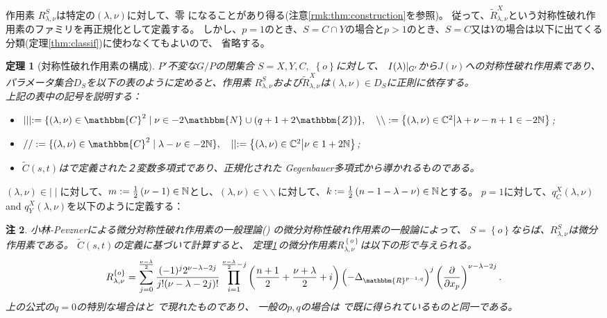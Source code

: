\documentclass[12pt]{article} %
\newcommand{\assign}{:=}
\newtheorem{theorem}{定理}
\newtheorem{remark}[theorem]{注}
\theoremstyle{definition}
\theoremstyle{exampstyle} \newtheorem{examp}[theorem]{Theorem}
\newcommand{\IlambdaGprime}{I(\lambda)\kern-0.3em\mid_{G'}}
\newcommand{\bb}{\backslash\backslash}
\begin{document}
作用素
$R_{\lambda,\nu}^S$は特定の$(\lambda,\nu)$に対して、零
になることがあり得る(注意\ref{rmk:thm:construction}を参照)。
従って、$\tilde{R}^X_{\lambda,\nu}$という対称性破れ作用素のファミリを再正規化として定義する。
しかし、$p=1$のとき、$S=C\cap Y$の場合と$p>1$のとき、$S=C$又は$Y$の場合は以下に出てくる分類(定理\ref{thm:classif})に使わなくてもよいので、
省略する。
\newpage
\begin{theorem}[対称性破れ作用素の構成]\label{thm:construction}
	$P'$不変な$G/P$の閉集合
	$S=X,Y,C,$ $\left\{ o \right\}$に対して、
	$\IlambdaGprime$から$J(\nu)$への対称性破れ作用素であり、
	パラメータ集合$D_S$を以下の表のように定めると、作用素
	$R_{\lambda,\nu}^S$および$\tilde{R}_{\lambda,\nu}^X$は$(\lambda,\nu)\in D_S$に正則に依存する。
	\\
\vspace{\baselineskip}
上記の表中の記号を説明する：
\begin{itemize}
	\item $\mid \mid \mid \assign \{ (\lambda, \nu) \in \mathbbm{C}^2 \mid \nu \in
	- 2\mathbbm{N} \cup (q + 1 + 2\mathbbm{Z}) \},\quad \backslash\backslash:=\mysetn{(\lambda,\nu)\in\C^2}{\lambda+\nu-n+1\in-2\N}$;
\item $/ / \assign
\{ (\lambda, \nu) \in \mathbbm{C}^2 \mid \lambda - \nu \in
-2\N \},\quad \mid\mid:=\mysetn{(\lambda,\nu)\in\C^2}{\nu\in1+2\N}$;
\item $\tilde{C}(s,t)$は\cite[(16.3)]{kobayashi2015symmetry}で定義された２変数多項式であり、正規化された
	Gegenbauer多項式から導かれるものである。
\end{itemize}
\end{theorem}
$(\lambda,\nu)\in\mid\mid$に対して、$m:=\frac{1}{2}\left( \nu-1 \right)\in\mathbb{N}$とし、$(\lambda,\nu)\in\bb$に対して、$k:=\frac{1}{2}\left( n-1-\lambda-\nu \right)\in\mathbb{N}$とする。
$p=1$に対して、$q_C^X(\lambda,\nu)$ and $q_Y^X(\lambda,\nu)$を以下のように定義する：
\begin{remark}
	小林-Pevznerによる微分対称性破れ作用素の一般理論(\cite[Chap.\ 2]{kobayashi2016differential1})
	の微分対称性破れ作用素の一般論によって、
	$S=\left\{ o \right\}$ならば、$R_{\lambda,\nu}^S$は微分作用素である。
	$\tilde{C}(s,t)$の定義に基づいて計算すると、
	定理\ref{thm:construction}\,の微分作用素$R_{\lambda,\nu}^{ \left\{ o \right\}}$は以下の形で与えられる。
	\begin{equation*}
		R_{\lambda,\nu}^{ \left\{ o \right\}}=
		\sum_{j=0}^{\frac{\nu-\lambda}{2}}\frac{(-1)^j2^{\nu-\lambda-2j}}{j!(\nu-\lambda-2j)!}\prod_{i=1}^{\frac{\nu-\lambda}{2}-j}\left( \frac{n
		+1}{2}+\frac{\nu+\lambda}{2}
		+i \right)\left(- \Delta_{\mathbbm{R}^{p-1,q}} \right)^j\left( \frac{\partial}{\partial x_p} \right)^{\nu-\lambda-2j}.
	\end{equation*}
	上の公式の$q=0$の特別な場合は\cite[Thms. 5.1.1 and 5.2.1]{juhl2009families}と\cite[(10.1)]{kobayashi2015symmetry}
	で現れたものであり、
	一般の$p,q$の場合は
	\cite[Thm.\ 4.3]{kobayashi2015branching}で既に得られているものと同一である。
\end{remark}
\end{document}
